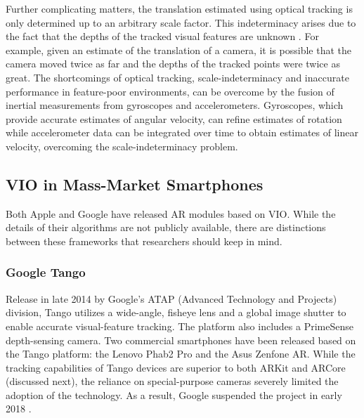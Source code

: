 \documentclass[chi_draft]{sigchi}
\begin{document}
Further complicating matters, the translation estimated using optical tracking is only determined up to an arbitrary scale factor.  This indeterminacy arises due to the fact that the depths of the tracked visual features are unknown \cite{Hartley2004}.  For example, given an estimate of the translation of a camera, it is possible that the camera moved twice as far and the depths of the tracked points were twice as great.  The shortcomings of optical tracking, scale-indeterminacy and inaccurate performance in feature-poor environments, can be overcome by the fusion of inertial measurements from gyroscopes and accelerometers.  Gyroscopes, which provide accurate estimates of angular velocity, can refine estimates of rotation while accelerometer data can be integrated over time to obtain estimates of linear velocity, overcoming the scale-indeterminacy problem.

\subsection{VIO in Mass-Market Smartphones}
Both Apple and Google have released AR modules based on VIO.  While the details of their algorithms are not publicly available, there are distinctions between these frameworks that researchers should keep in mind.

\subsubsection{Google Tango}
Release in late 2014 by Google's ATAP (Advanced Technology and Projects) division, Tango utilizes a wide-angle, fisheye lens and a global image shutter to enable accurate visual-feature tracking.  The platform also includes a PrimeSense depth-sensing camera.  Two commercial smartphones have been released based on the Tango platform: the Lenovo Phab2 Pro and the Asus Zenfone AR.  While the tracking capabilities of Tango devices are superior to both ARKit and ARCore (discussed next), the reliance on special-purpose cameras severely limited the adoption of the technology.  As a result, Google suspended the project in early 2018 \cite{tangoretired}.
\end{document}
